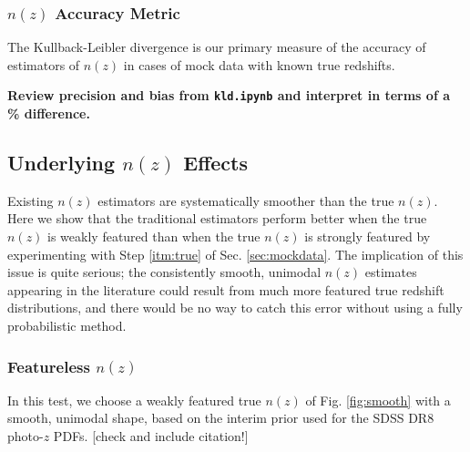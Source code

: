 \documentclass[iop]{emulateapj}
\begin{document}
\subsubsection{$n(z)$ Accuracy Metric}
\label{sec:accuracy}

The Kullback-Leibler divergence is our primary measure of the accuracy of estimators of $n(z)$ in cases of mock data with known true redshifts.

\textbf{Review precision and bias from \texttt{kld.ipynb} and interpret in terms of a \% difference.}

\subsection{Underlying $n(z)$ Effects}
\label{sec:truth}

Existing $n(z)$ estimators are systematically smoother than the true $n(z)$.  Here we show that the traditional estimators perform better when the true $n(z)$ is weakly featured than when the true $n(z)$ is strongly featured by experimenting with Step \ref{itm:true} of Sec. \ref{sec:mockdata}.  The implication of this issue is quite serious; the consistently smooth, unimodal $n(z)$ estimates appearing in the literature could result from much more featured true redshift distributions, and there would be no way to catch this error without using a fully probabilistic method.

\subsubsection{Featureless $n(z)$}
\label{sec:smooth}

In this test, we choose a weakly featured true $n(z)$ of Fig. \ref{fig:smooth} with a smooth, unimodal shape, based on the interim prior used for the SDSS DR8 photo-$z$ PDFs.  [check and include citation!]
\end{document}
